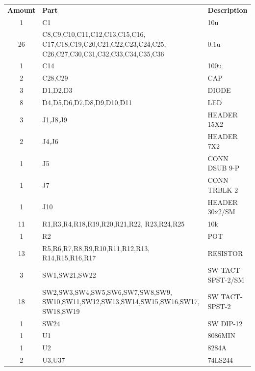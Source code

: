 \begin{appendices}
        \def\arraystretch{1.22}
        \begin{table}[H]
            \footnotesize
            \begin{tabular*}{100pt}{@{\extracolsep{\fill}} c p{10cm} p{10cm}}
                \textbf{Amount} & \textbf{Part} & \textbf{Description} \\
                1 & C1 & 10u \\
                26 & C8,C9,C10,C11,C12,C13,C15,C16,\newline
                C17,C18,C19,C20,C21,C22,C23,C24,C25,\newline 
                C26,C27,C30,C31,C32,C33,C34,C35,C36 & 0.1u \\
                1 & C14 & 100u \\
                2 & C28,C29 & CAP \\
                3 & D1,D2,D3 & DIODE \\
                8 & D4,D5,D6,D7,D8,D9,D10,D11 & LED \\
                3 & J1,J8,J9 & HEADER 15X2 \\
                2 & J4,J6 & HEADER 7X2 \\
                1 & J5 & CONN DSUB 9-P \\
                1 & J7 & CONN TRBLK 2 \\
                1 & J10 & HEADER 30x2/SM \\
                11 & R1,R3,R4,R18,R19,R20,R21,R22,\newline
                R23,R24,R25 & 10k \\
                1 & R2 & POT \\
                13 & R5,R6,R7,R8,R9,R10,R11,R12,R13,\newline
                R14,R15,R16,R17 & RESISTOR \\
                3 & SW1,SW21,SW22 & SW TACT-SPST-2/SM \\
                18 & SW2,SW3,SW4,SW5,SW6,SW7,SW8,SW9,\newline
                SW10,SW11,SW12,SW13,SW14,SW15,SW16,SW17,\newline
                SW18,SW19 & SW TACT-SPST-2 \\
                1 & SW24 & SW DIP-12 \\
                1 & U1 & 8086MIN \\
                1 & U2 & 8284A \\
                2 & U3,U37 & 74LS244 \\

\end{tabular*}
\end{table}
\end{appendices}
